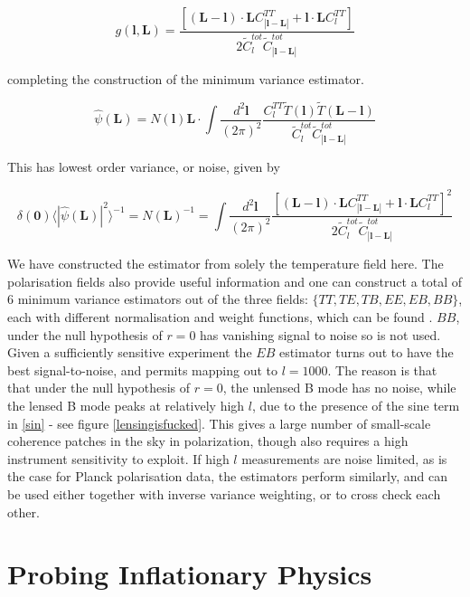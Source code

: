 \documentclass[a4paper,10pt]{article}
\renewcommand{\v}[1]{\mathbf{#1}}
\newcommand{\finttwo}[1]{\int \frac{d^2 \v{#1}}{(2\pi)^2}}
\begin{document}
\begin{equation}
g(\v{l},\v{L}) = \frac{[(\v{L}-\v{l})\cdot\v{L}C^{TT}_{|\v{l}-\v{L}|}+\v{l}\cdot\v{L}C_l^{TT}]}{2\tilde{C}_l^{tot}\tilde{C}_{|\v{l}-\v{L}|}^{tot}}
\end{equation}

completing the construction of the minimum variance estimator. 

\begin{equation}
\hat{\psi}(\v{L}) = N(\v{l})\v{L}\cdot\finttwo{l} \frac{C_l^{TT}\tilde{T}(\v{l})\tilde{T}(\v{L-l})}{\tilde{C}_l^{tot}\tilde{C}_{|\v{l}-\v{L}|}^{tot}}
\end{equation}


This has lowest order variance, or noise, given by


\begin{equation}
\delta(\v{0}) \langle |\hat{\psi}(\v{L})|^2 \rangle^{-1} =  N(\v{L})^{-1} = \finttwo{l}  \frac{[(\v{L}-\v{l})\cdot\v{L}C^{TT}_{|\v{l}-\v{L}|}+\v{l}\cdot\v{L}C_l^{TT}]^2}{2\tilde{C}_l^{tot}\tilde{C}_{|\v{l}-\v{L}|}^{tot}}
\end{equation}

We have constructed the estimator from solely the temperature field here. The polarisation fields also provide useful information and one can construct a total of 6 minimum variance estimators out of the three fields: $\{TT, TE, TB, EE, EB, BB\}$, each with different normalisation and weight functions, which can be found \cite{hu-estimator}. $BB$, under the null hypothesis of $r=0$ has vanishing signal to noise so is not used. Given a sufficiently sensitive experiment the $EB$ estimator turns out to have the best signal-to-noise, and permits mapping out to $l=1000$. The reason is that that under the null hypothesis of $r=0$, the unlensed B mode has no noise, while the lensed B mode peaks at relatively high $l$, due to the presence of the sine term in \ref{sin} - see figure \ref{lensingisfucked}. This gives a large number of small-scale coherence patches in the sky in polarization, though also requires a high instrument sensitivity to exploit. If high $l$ measurements are noise limited, as is the case for Planck polarisation data, the estimators perform similarly, and can be used either together with inverse variance weighting, or to cross check each other.


\newpage
\section{Probing Inflationary Physics}
\label{probe}
\end{document}
